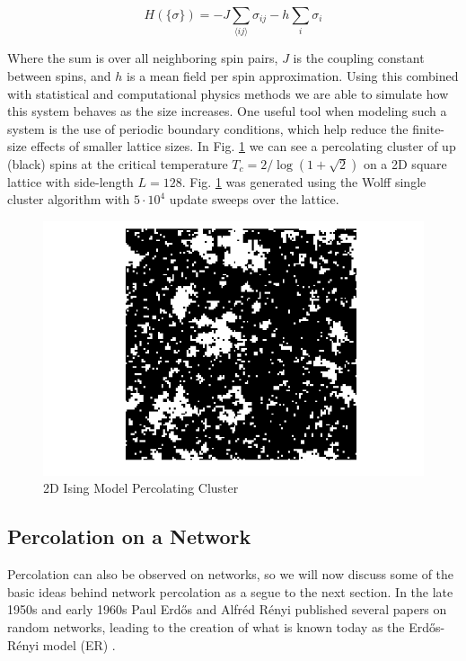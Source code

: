 \begin{equation}
	\label{eqn:Ising_Hamiltonian}
	H(\{\sigma\}) = -J \sum_{\langle i j \rangle} \sigma_{ij} -h \sum_i \sigma_i
\end{equation}

Where the sum is over all neighboring spin pairs, $J$ is the coupling constant between spins, and $h$ is a mean field per spin approximation.
Using this combined with statistical and computational physics methods we are able to simulate how this system behaves as the size increases.
One useful tool when modeling such a system is the use of periodic boundary conditions, which help reduce the finite-size effects of smaller lattice sizes.
In Fig. \ref{fig:Ising_percolation} we can see a percolating cluster of up (black) spins at the critical temperature $T_c = 2 / \log(1 + \sqrt{2})$ on a 2D square lattice with side-length $L = 128$.
Fig. \ref{fig:Ising_percolation} was generated using the Wolff single cluster algorithm with $5 \cdot 10^4$ update sweeps over the lattice.

\begin{figure}[H]
	\centering
	\includegraphics[width=350pt]{images/Ising_128_percolation.png}
	\caption{2D Ising Model Percolating Cluster}
	\label{fig:Ising_percolation}
\end{figure}









\subsection{Percolation on a Network}
Percolation can also be observed on networks, so we will now discuss some of the basic ideas behind network percolation as a segue to the next section.
In the late 1950s and early 1960s Paul Erdős and Alfréd Rényi published several papers on random networks, leading to the creation of what is known today as the Erdős-Rényi model (ER) \cite{ER1} \cite{ER2}.


